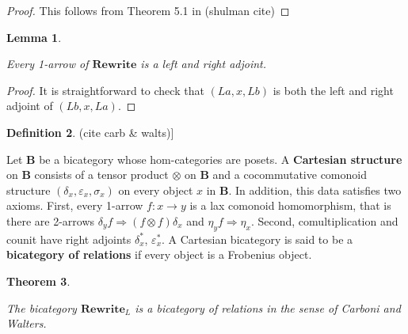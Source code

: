 \documentclass{amsart}
\renewcommand{\epsilon}{\varepsilon}
\newcommand{\defn}[1]{\textbf{#1}}
\newcommand{\cat}[1]{\mathbf{#1}}
\newcommand{\from}{\colon}
\newcommand{\Rewrite}{\mathbf{Rewrite} }
\newcommand{\edit}[1]{\textcolor{editcolour}{(#1)}}
\newtheorem{theorem}{Theorem}[section]
\newtheorem{lemma}[theorem]{Lemma}
\theoremstyle{remark}
\theoremstyle{definition}
\newtheorem{definition}[theorem]{Definition}
\begin{document}
\begin{proof}

  This follows from Theorem 5.1 in \edit{shulman cite} 

\end{proof} 

\begin{lemma}
  \label{thm:bicat-rewr-arrows-dual}
  
  Every 1-arrow of $ \Rewrite $ is a left and right adjoint.
  
\end{lemma}

\begin{proof}
  
  It is straightforward to check that $ ( La , x , Lb ) $ is both the
  left and right adjoint of $ ( Lb , x , La ) $.
  
\end{proof}

\begin{definition}\edit{cite carb \& walts}]
  \label{def:bicat-rels}

  Let $ \cat{B} $ be a bicategory whose hom-categories are posets. A
  \defn{Cartesian structure} on $ \cat{B} $ consists of a tensor
  product $ \otimes $ on $ \cat{B} $ and a cocommutative comonoid
  structure $ (\delta_x , \epsilon_x , \sigma_x ) $ on every object
  $ x $ in $ \cat{B} $.  In addition, this data satisfies two
  axioms. First, every 1-arrow $ f \from x \to y $ is a lax comonoid
  homomorphism, that is there are 2-arrows
  $ \delta_y f \Rightarrow (f \otimes f) \delta_x $ and
  $ \eta_y f \Rightarrow \eta_x $. Second, comultiplication and counit
  have right adjoints $ \delta^\ast_x $, $ \epsilon^\ast_x $. A
  Cartesian bicategory is said to be a \defn{bicategory of relations}
  if every object is a Frobenius object.
  
 \end{definition}

\begin{theorem}
   \label{thm:bicat-rewr-bicat-rel}

   The bicategory $ \Rewrite_{L} $ is a bicategory of relations in the
   sense of Carboni and Walters.
   
\end{theorem}
\end{document}

